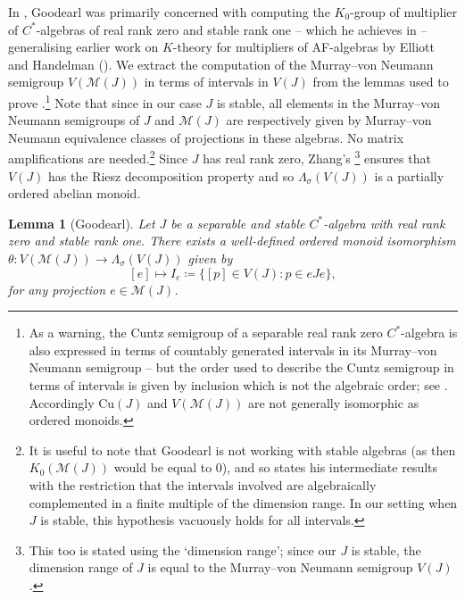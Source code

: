 \documentclass[reqno]{amsart}
\newtheorem{lem}[thm]{Lemma}
\theoremstyle{definition}
\theoremstyle{remark}
\numberwithin{equation}{section}
\theoremstyle{definition}
\newcommand{\calM}{\mathcal{M}}
\begin{document}
In \cite[Section 1]{Goodearl}, Goodearl was primarily concerned with computing the $K_0$-group of multiplier of $C^*$-algebras of real rank zero and stable rank one -- which he achieves in \cite[Theorem 1.10]{Goodearl} -- generalising earlier work on $K$-theory for multipliers of AF-algebras by Elliott and Handelman (\cite{ElliottHandelman:PJM}).  We extract the computation of the Murray--von Neumann semigroup $V(\mathcal M(J))$ in terms of intervals in $V(J)$ from the lemmas used to prove \cite[Theorem 1.10]{Goodearl}.\footnote{As a warning, the Cuntz semigroup of a separable real rank zero $C^*$-algebra is also expressed in terms of countably generated intervals in its Murray--von Neumann semigroup -- but the order used to describe the Cuntz semigroup in terms of intervals is given by inclusion which is not the algebraic order; see \cite[Theorem 5.7]{RR0_Cuntz}. Accordingly $\mathrm{Cu}(J)$ and $V(\calM(J))$ are not generally isomorphic as ordered monoids.} Note that since in our case $J$ is stable, all elements in the Murray--von Neumann semigroups of $J$ and $\calM(J)$ are respectively given by Murray--von Neumann equivalence classes of projections in these algebras. No matrix amplifications are needed.\footnote{It is useful to note that Goodearl is not working with stable algebras (as then $K_0(\mathcal M(J))$ would be equal to $0$), and so states his intermediate results with the restriction that the intervals involved are algebraically complemented in a finite multiple of the dimension range. In our setting when $J$ is stable, this hypothesis vacuously holds for all intervals.} Since $J$ has real rank zero, Zhang's \cite[Theorem 1.1]{Riesz-dec}\footnote{This too is stated using the `dimension range'; since our $J$ is stable, the dimension range of $J$ is equal to the Murray--von Neumann semigroup $V(J)$.} ensures that $V(J)$ has the Riesz decomposition property and so $\Lambda_{\sigma}(V(J))$ is a partially ordered abelian monoid. 

\begin{lem}[Goodearl]
\label{dr-cgi} 
Let $J$ be a separable and stable $C^*$-algebra with real rank zero and stable rank one. There exists a well-defined ordered monoid isomorphism $\theta: V(\calM(J))\rightarrow \Lambda_{\sigma}(V(J))$ given by 
\begin{equation} \label{theta}
[e]\mapsto I_{e} \coloneqq \{[p]\in V(J): p\in eJe\}, 
\end{equation} 
for any projection $e\in \calM(J)$. 
\end{lem} 
\end{document}
